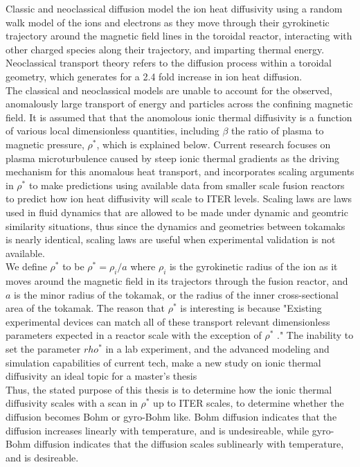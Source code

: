 \documentclass{article}
\begin{document}
Classic and neoclassical diffusion model the ion heat diffusivity using a random walk model of the ions and electrons as they move through their gyrokinetic trajectory around the magnetic field lines in the toroidal reactor, interacting with other charged species along their trajectory, and imparting thermal energy. Neoclassical transport theory refers to the diffusion process within a toroidal geometry, which generates for a 2.4 fold increase in ion heat diffusion.\\
The classical and neoclassical models are unable to account for the observed, anomalously large transport of energy and particles across the confining magnetic field. It is assumed that that the anomolous ionic thermal diffusivity is a function of various local dimensionless quantities, including $\beta$ the ratio of plasma to magnetic  pressure, $\rho^*$, which is explained below.  Current research \cite{Yas_Ido} focuses on plasma microturbulence caused by steep ionic thermal gradients as the driving mechanism for this anomalous heat transport, and incorporates scaling arguments in $\rho^*$ to make predictions using available data from smaller scale fusion reactors to predict how ion heat diffusivity will scale to ITER levels. Scaling laws are laws used in fluid dynamics that are allowed to be made under dynamic and geomtric similarity situations, thus since the dynamics and geometries between tokamaks is nearly identical, scaling laws are useful when experimental validation is not available.\\

We define $\rho^*$ to be $\rho^* = \rho_i/a$ where $\rho_i$ is the gyrokinetic radius of the ion as it moves around the magnetic field in its trajectors through the fusion reactor, and $a$ is the minor radius of the tokamak, or the radius of the inner cross-sectional area of the tokamak. The reason that $\rho^*$ is interesting is because "Existing experimental devices can match all of these transport relevant dimensionless parameters expected in a reactor scale with the exception of $\rho^*$ \cite{McKee_Et}." The inability to set the parameter $rho^*$ in a lab experiment, and the advanced modeling and simulation capabilities of current tech, make a new study on ionic thermal diffusivity an ideal topic for a master's thesis\\

Thus, the stated purpose of this thesis is to determine how the ionic thermal diffusivity scales with a scan in $\rho^*$ up to ITER scales, to determine whether the diffusion becomes Bohm or gyro-Bohm like. Bohm diffusion indicates that the diffusion increases linearly with temperature, and is undesireable, while gyro-Bohm diffusion indicates that the  diffusion scales sublinearly with temperature, and is desireable.
\end{document}
